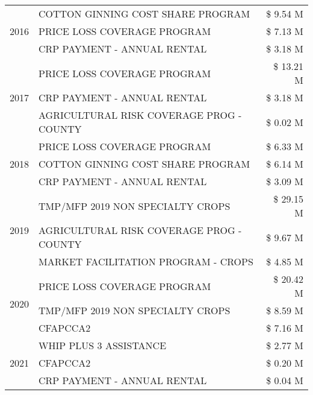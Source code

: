 \begin{tabular}{llr}
\cline{1-3}
\multirow[t]{3}{*}{2016} & COTTON GINNING COST SHARE PROGRAM & \$ 9.54 M \\
 & PRICE LOSS COVERAGE PROGRAM & \$ 7.13 M \\
 & CRP PAYMENT - ANNUAL RENTAL & \$ 3.18 M \\
\cline{1-3}
\multirow[t]{3}{*}{2017} & PRICE LOSS COVERAGE PROGRAM & \$ 13.21 M \\
 & CRP PAYMENT - ANNUAL RENTAL & \$ 3.18 M \\
 & AGRICULTURAL RISK COVERAGE PROG - COUNTY & \$ 0.02 M \\
\cline{1-3}
\multirow[t]{3}{*}{2018} & PRICE LOSS COVERAGE PROGRAM & \$ 6.33 M \\
 & COTTON GINNING COST SHARE PROGRAM & \$ 6.14 M \\
 & CRP PAYMENT - ANNUAL RENTAL & \$ 3.09 M \\
\cline{1-3}
\multirow[t]{3}{*}{2019} & TMP/MFP 2019 NON SPECIALTY CROPS & \$ 29.15 M \\
 & AGRICULTURAL RISK COVERAGE PROG - COUNTY & \$ 9.67 M \\
 & MARKET FACILITATION PROGRAM - CROPS & \$ 4.85 M \\
\cline{1-3}
\multirow[t]{3}{*}{2020} & PRICE LOSS COVERAGE PROGRAM & \$ 20.42 M \\
 & TMP/MFP 2019 NON SPECIALTY CROPS & \$ 8.59 M \\
 & CFAPCCA2 & \$ 7.16 M \\
\cline{1-3}
\multirow[t]{3}{*}{2021} & WHIP PLUS 3 ASSISTANCE & \$ 2.77 M \\
 & CFAPCCA2 & \$ 0.20 M \\
 & CRP PAYMENT - ANNUAL RENTAL & \$ 0.04 M \\
\cline{1-3}
\bottomrule
\end{tabular}
